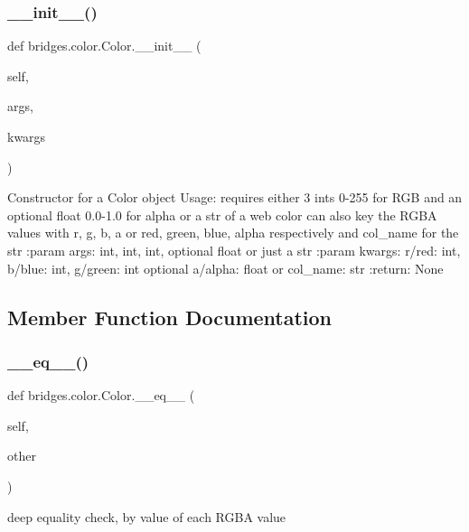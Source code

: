 \subsubsection{\texorpdfstring{\+\_\+\+\_\+init\+\_\+\+\_\+()}{\_\_init\_\_()}}
{\footnotesize\ttfamily def bridges.\+color.\+Color.\+\_\+\+\_\+init\+\_\+\+\_\+ (\begin{DoxyParamCaption}\item[{}]{self,  }\item[{}]{args,  }\item[{}]{kwargs }\end{DoxyParamCaption})}

\begin{DoxyVerb}Constructor for a Color object
Usage: requires either 3 ints 0-255 for RGB and an optional float 0.0-1.0 for alpha or a str of a web color
can also key the RGBA values with r, g, b, a or red, green, blue, alpha respectively and col_name for the str
:param args: int, int, int, optional float or just a str
:param kwargs: r/red: int, b/blue: int, g/green: int optional a/alpha: float or col_name: str
:return: None
\end{DoxyVerb}
 

\subsection{Member Function Documentation}
\mbox{\label{classbridges_1_1color_1_1_color_ae5677a0858252f0b33da13866fb62786}} 
\subsubsection{\texorpdfstring{\+\_\+\+\_\+eq\+\_\+\+\_\+()}{\_\_eq\_\_()}}
{\footnotesize\ttfamily def bridges.\+color.\+Color.\+\_\+\+\_\+eq\+\_\+\+\_\+ (\begin{DoxyParamCaption}\item[{}]{self,  }\item[{}]{other }\end{DoxyParamCaption})}

\begin{DoxyVerb}deep equality check, by value of each RGBA value\end{DoxyVerb}
 \mbox{\label{classbridges_1_1color_1_1_color_ae5dc631fcda27156867b21109620ae21}} 
